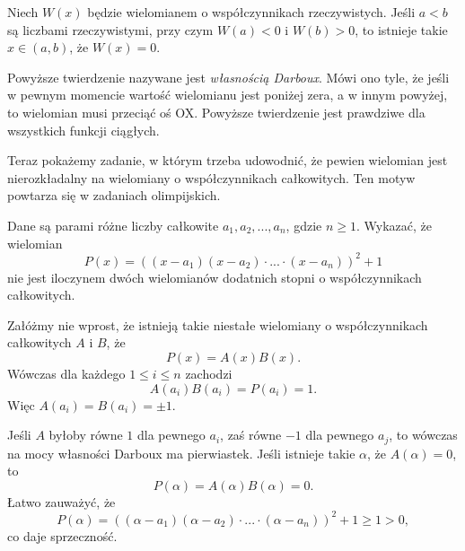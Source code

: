 \noindent
Niech $W(x)$ będzie wielomianem o współczynnikach rzeczywistych. Jeśli $a < b$ są liczbami rzeczywistymi, przy czym $W(a) < 0$ i $W(b) > 0$, to istnieje takie $x \in (a, b)$, że $W(x) = 0$.
\begin{center}
	
\end{center}

\vspace{20px}
\noindent
Powyższe twierdzenie nazywane jest \textit{własnością Darboux}. Mówi ono tyle, że jeśli w pewnym momencie wartość wielomianu jest poniżej zera, a w innym powyżej, to wielomian musi przeciąć oś OX. Powyższe twierdzenie jest prawdziwe dla wszystkich funkcji ciągłych.
\vspace{5px}


\noindent
Teraz pokażemy zadanie, w którym trzeba udowodnić, że pewien wielomian jest nierozkładalny na wielomiany o współczynnikach całkowitych. Ten motyw powtarza się w zadaniach olimpijskich.
\vspace{5px}


\noindent
Dane są parami różne liczby całkowite $a_1, a_2, ..., a_n$, gdzie $n \geqslant 1$. Wykazać, że wielomian 
\[
	P(x)=((x − a_1)(x − a_2)\cdot ...\cdot (x − a_n))^2 + 1
\]
nie jest iloczynem dwóch wielomianów dodatnich stopni o współczynnikach całkowitych.
\vspace{5px}


\noindent
Załóżmy nie wprost, że istnieją takie niestałe wielomiany o współczynnikach całkowitych $A$ i $B$, że
\[
	P(x) = A(x)B(x).
\]
Wówczas dla każdego $1 \leqslant i \leqslant n$ zachodzi
\[
	A(a_i)B(a_i) = P(a_i) = 1.
\]
Więc $A(a_i) = B(a_i) = \pm 1$. 

\vspace{10px}
\noindent
Jeśli $A$ byłoby równe $1$ dla pewnego $a_i$, zaś równe $-1$ dla pewnego $a_j$, to wówczas na mocy własności Darboux ma pierwiastek. Jeśli istnieje takie $\alpha$, że $A(\alpha) = 0$, to
\[
	P(\alpha) = A(\alpha)B(\alpha) = 0.
\]
Łatwo zauważyć, że
\[
	P(\alpha) = ((\alpha − a_1)(\alpha − a_2)\cdot ...\cdot (\alpha − a_n))^2 + 1 \geqslant 1 > 0,
\]
co daje sprzeczność.


